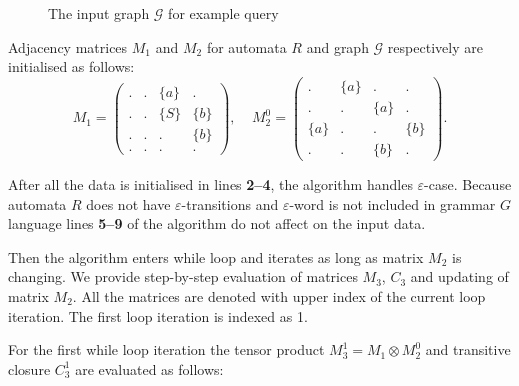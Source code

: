 \begin{figure}[h]
        \centering
        \caption{The input graph $\mathcal{G}$ for example query}
        \label{input:graph}
\end{figure}

Adjacency matrices $M_1$ and $M_2$ for automata $R$ and graph $\mathcal{G}$ respectively are initialised as follows:
    $$
    M_1 =
    \begin{pmatrix}
    . & . & \{a\} & .     \\
    . & . & \{S\} & \{b\} \\
    . & . & . & \{b\}     \\
    . & . & . & .
    \end{pmatrix}
    ,~~~~~
    M_2^0 =
    \begin{pmatrix}
    . & \{a\} & . & .     \\
    . & . & \{a\} & .     \\
    \{a\} & . & . & \{b\} \\
    . & . & \{b\} & .
    \end{pmatrix}.
    $$

After all the data is initialised in lines \textbf{2--4}, the algorithm handles $\varepsilon$-case. Because automata $R$ does not have $\varepsilon$-transitions and $\varepsilon$-word is not included in grammar $G$ language lines \textbf{5--9} of the algorithm do not affect on the input data.

Then the algorithm enters while loop and iterates as long as matrix $M_2$ is changing. We provide step-by-step evaluation of matrices $M_3$, $C_3$ and updating of matrix $M_2$. All the matrices are denoted with upper index of the current loop iteration. The first loop iteration is indexed as 1.

For the first while loop iteration the tensor product $M_3^1 = M_1 \otimes M_2^0$ and transitive closure $C_3^1$ are evaluated as follows:

